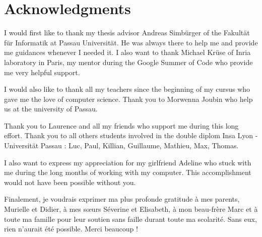 
\begingroup
\let\clearpage\relax
\let\cleardoublepage\relax
\let\cleardoublepage\relax
\chapter*{Acknowledgments}
I would first like to thank my thesis advisor Andreas Simbürger of the Fakultät für Informatik at Passau Universität. He was always there to help me and provide me guidances whenever I needed it. 
I also want to thank Michael Krüse of Inria laboratory in Paris, my mentor during the Google Summer of Code who provide me very helpful support.

\bigskip

I would also like to thank all my teachers since the beginning of my cursus who gave me the love of computer science. Thank you to Morwenna Joubin who help us at the university of Passau. 

\bigskip

Thank you to Laurence and all my friends who support me during this long effort.
Thank you to all others students involved in the double diplom Insa Lyon - Universität Passau : Luc, Paul, Killian, Guillaume, Mathieu, Max, Thomas.

\bigskip

I also want to express my appreciation for my girlfriend Adeline who stuck with me during the long months of working with my computer. This accomplishment would not have been possible without you. 

\bigskip

Finalement, je voudrais exprimer ma plus profonde gratitude à mes parents, Murielle et Didier, à mes sœurs Séverine et Elisabeth, à mon beau-frère Marc et à toute ma famille pour leur soutien sans faille durant toute ma scolarité. Sans eux, rien n'aurait été possible. Merci beaucoup !

\endgroup



